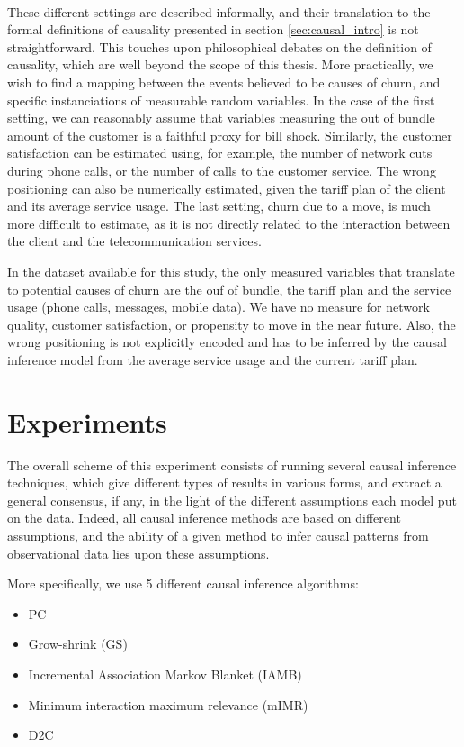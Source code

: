 \paragraph{} These different settings are described informally, and their
translation to the formal definitions of causality presented in section
\ref{sec:causal_intro} is not straightforward. This touches upon philosophical
debates on the definition of causality, which are well beyond the scope of this
thesis. More practically, we wish to find a mapping between the events believed
to be causes of churn, and specific instanciations of measurable random
variables. In the case of the first setting, we can reasonably assume that
variables measuring the out of bundle amount of the customer is a faithful proxy
for bill shock.  Similarly, the customer satisfaction can be estimated using,
for example, the number of network cuts during phone calls, or the number of
calls to the customer service. The wrong positioning can also be numerically
estimated, given the tariff plan of the client and its average service usage.
The last setting, churn due to a move, is much more difficult to estimate, as it
is not directly related to the interaction between the client and the
telecommunication services.

In the dataset available for this study, the only measured variables that
translate to potential causes of churn are the ouf of bundle, the tariff plan
and the service usage (phone calls, messages, mobile data). We have no measure
for network quality, customer satisfaction, or propensity to move in the near
future. Also, the wrong positioning is not explicitly encoded and has to be
inferred by the causal inference model from the average service usage and the
current tariff plan.

\section{Experiments}
\label{sec:causal_experiments}

The overall scheme of this experiment consists of running several causal
inference techniques, which give different types of results in various forms,
and extract a general consensus, if any, in the light of the different
assumptions each model put on the data. Indeed, all causal inference methods are
based on different assumptions, and the ability of a given method to infer
causal patterns from observational data lies upon these assumptions.

More specifically, we use 5 different causal inference algorithms:
\noprelistbreak
\begin{itemize}
    \item PC
	\item Grow-shrink (GS)
	\item Incremental Association Markov Blanket (IAMB)
	\item Minimum interaction maximum relevance (mIMR)
	\item D2C
\end{itemize}

